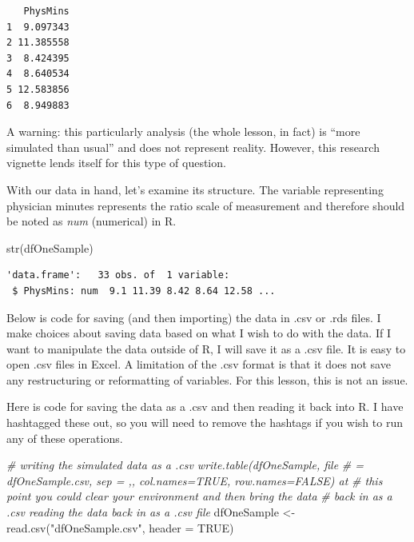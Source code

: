 \documentclass[
  11pt,
]{book}
\newenvironment{Shaded}{\begin{snugshade}}{\end{snugshade}}
\newcommand{\AttributeTok}[1]{\textcolor[rgb]{0.77,0.63,0.00}{#1}}
\newcommand{\CommentTok}[1]{\textcolor[rgb]{0.56,0.35,0.01}{\textit{#1}}}
\newcommand{\ConstantTok}[1]{\textcolor[rgb]{0.00,0.00,0.00}{#1}}
\newcommand{\FunctionTok}[1]{\textcolor[rgb]{0.00,0.00,0.00}{#1}}
\newcommand{\NormalTok}[1]{#1}
\newcommand{\OtherTok}[1]{\textcolor[rgb]{0.56,0.35,0.01}{#1}}
\newcommand{\StringTok}[1]{\textcolor[rgb]{0.31,0.60,0.02}{#1}}
\begin{document}
\begin{verbatim}
   PhysMins
1  9.097343
2 11.385558
3  8.424395
4  8.640534
5 12.583856
6  8.949883
\end{verbatim}

A warning: this particularly analysis (the whole lesson, in fact) is ``more simulated than usual'' and does not represent reality. However, this research vignette lends itself for this type of question.

With our data in hand, let's examine its structure. The variable representing physician minutes represents the ratio scale of measurement and therefore should be noted as \emph{num} (numerical) in R.

\begin{Shaded}
\begin{Highlighting}[]
\FunctionTok{str}\NormalTok{(dfOneSample)}
\end{Highlighting}
\end{Shaded}

\begin{verbatim}
'data.frame':   33 obs. of  1 variable:
 $ PhysMins: num  9.1 11.39 8.42 8.64 12.58 ...
\end{verbatim}

Below is code for saving (and then importing) the data in .csv or .rds files. I make choices about saving data based on what I wish to do with the data. If I want to manipulate the data outside of R, I will save it as a .csv file. It is easy to open .csv files in Excel. A limitation of the .csv format is that it does not save any restructuring or reformatting of variables. For this lesson, this is not an issue.

Here is code for saving the data as a .csv and then reading it back into R. I have hashtagged these out, so you will need to remove the hashtags if you wish to run any of these operations.

\begin{Shaded}
\begin{Highlighting}[]
\CommentTok{\# writing the simulated data as a .csv write.table(dfOneSample, file}
\CommentTok{\# = \textquotesingle{}dfOneSample.csv\textquotesingle{}, sep = \textquotesingle{},\textquotesingle{}, col.names=TRUE, row.names=FALSE) at}
\CommentTok{\# this point you could clear your environment and then bring the data}
\CommentTok{\# back in as a .csv reading the data back in as a .csv file}
\NormalTok{dfOneSample }\OtherTok{\textless{}{-}} \FunctionTok{read.csv}\NormalTok{(}\StringTok{"dfOneSample.csv"}\NormalTok{, }\AttributeTok{header =} \ConstantTok{TRUE}\NormalTok{)}
\end{Highlighting}
\end{Shaded}
\end{document}
